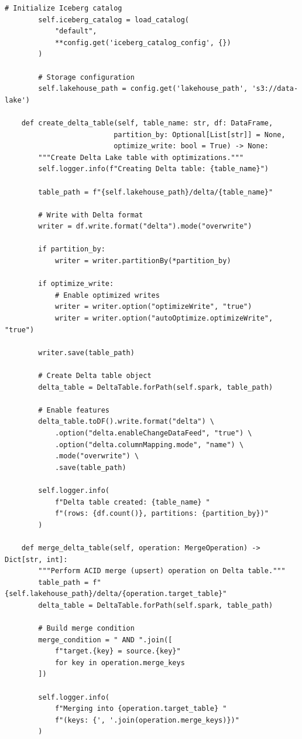\begin{lstlisting}[style=python, caption=LakehouseIntegrator with Modern Table Formats]
        # Initialize Iceberg catalog
        self.iceberg_catalog = load_catalog(
            "default",
            **config.get('iceberg_catalog_config', {})
        )

        # Storage configuration
        self.lakehouse_path = config.get('lakehouse_path', 's3://data-lake')

    def create_delta_table(self, table_name: str, df: DataFrame,
                          partition_by: Optional[List[str]] = None,
                          optimize_write: bool = True) -> None:
        """Create Delta Lake table with optimizations."""
        self.logger.info(f"Creating Delta table: {table_name}")

        table_path = f"{self.lakehouse_path}/delta/{table_name}"

        # Write with Delta format
        writer = df.write.format("delta").mode("overwrite")

        if partition_by:
            writer = writer.partitionBy(*partition_by)

        if optimize_write:
            # Enable optimized writes
            writer = writer.option("optimizeWrite", "true")
            writer = writer.option("autoOptimize.optimizeWrite", "true")

        writer.save(table_path)

        # Create Delta table object
        delta_table = DeltaTable.forPath(self.spark, table_path)

        # Enable features
        delta_table.toDF().write.format("delta") \
            .option("delta.enableChangeDataFeed", "true") \
            .option("delta.columnMapping.mode", "name") \
            .mode("overwrite") \
            .save(table_path)

        self.logger.info(
            f"Delta table created: {table_name} "
            f"(rows: {df.count()}, partitions: {partition_by})"
        )

    def merge_delta_table(self, operation: MergeOperation) -> Dict[str, int]:
        """Perform ACID merge (upsert) operation on Delta table."""
        table_path = f"{self.lakehouse_path}/delta/{operation.target_table}"
        delta_table = DeltaTable.forPath(self.spark, table_path)

        # Build merge condition
        merge_condition = " AND ".join([
            f"target.{key} = source.{key}"
            for key in operation.merge_keys
        ])

        self.logger.info(
            f"Merging into {operation.target_table} "
            f"(keys: {', '.join(operation.merge_keys)})"
        )


\end{lstlisting}
